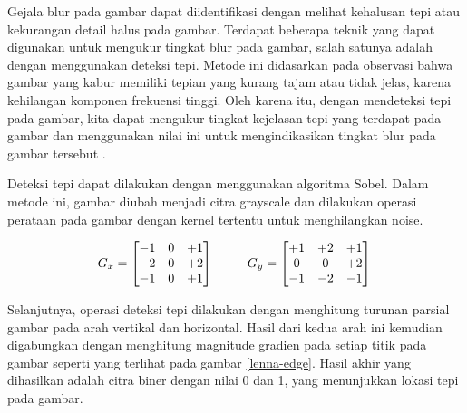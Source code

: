 Gejala blur pada gambar dapat diidentifikasi dengan melihat kehalusan tepi atau kekurangan detail halus pada gambar. Terdapat beberapa teknik yang dapat digunakan untuk mengukur tingkat blur pada gambar, salah satunya adalah dengan menggunakan deteksi tepi. Metode ini didasarkan pada observasi bahwa gambar yang kabur memiliki tepian yang kurang tajam atau tidak jelas, karena kehilangan komponen frekuensi tinggi. Oleh karena itu, dengan mendeteksi tepi pada gambar, kita dapat mengukur tingkat kejelasan tepi yang terdapat pada gambar dan menggunakan nilai ini untuk mengindikasikan tingkat blur pada gambar tersebut \citep{Ferzli_2009}. 

Deteksi tepi dapat dilakukan dengan menggunakan algoritma Sobel. Dalam metode ini, gambar diubah menjadi citra grayscale dan dilakukan operasi perataan pada gambar dengan kernel tertentu untuk menghilangkan noise.

\begin{equation} 
	\label{eq3-10}
	G_x = 
	\begin{bmatrix}
		-1 & 0 & +1 \\
		-2 & 0 & +2 \\
		-1 & 0 & +1
	\end{bmatrix} \ \ \ \ \ \ \ \    
	G_y=
	\begin{bmatrix}
		+1 & +2 & +1 \\
		0  & 0  & +2 \\
		-1 & -2 & -1
	\end{bmatrix}\\
	\vspace{0.5cm}
\end{equation}


Selanjutnya, operasi deteksi tepi dilakukan dengan menghitung turunan parsial gambar pada arah vertikal dan horizontal. Hasil dari kedua arah ini kemudian digabungkan dengan menghitung magnitude gradien pada setiap titik pada gambar seperti yang terlihat pada gambar \ref{lenna-edge}. Hasil akhir yang dihasilkan adalah citra biner dengan nilai 0 dan 1, yang menunjukkan lokasi tepi pada gambar.

